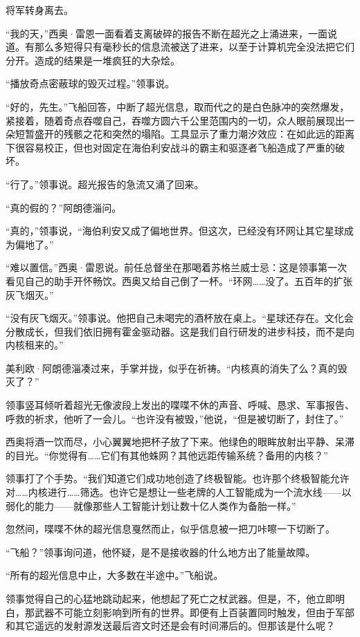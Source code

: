 \documentclass[AutoFakeBold=true]{book}
\begin{document}
将军转身离去。

\vspace*{1em}

``我的天，''西奥·雷恩一面看着支离破碎的报告不断在超光之上涌进来，一面说道。有那么多短得只有毫秒长的信息流被送了进来，以至于计算机完全没法把它们分开。造成的结果是一堆疯狂的大杂烩。

``播放奇点密蔽球的毁灭过程。''领事说。

``好的，先生。''飞船回答，中断了超光信息，取而代之的是白色脉冲的突然爆发，紧接着，随着奇点吞噬自己，吞噬方圆六千公里范围内的一切，众人眼前展现出一朵短暂盛开的残骸之花和突然的塌陷。工具显示了重力潮汐效应：在如此远的距离下很容易校正，但也对固定在海伯利安战斗的霸主和驱逐者飞船造成了严重的破坏。

``行了。''领事说。超光报告的急流又涌了回来。

``真的假的？''阿朗德淄问。

``真的，''领事说，``海伯利安又成了偏地世界。但这次，已经没有环网让其它星球成为偏地了。''

``难以置信。''西奥·雷恩说。前任总督坐在那喝着苏格兰威士忌：这是领事第一次看见自己的助手开怀畅饮。西奥又给自己倒了一杯。``环网……没了。五百年的扩张灰飞烟灭。''

``没有灰飞烟灭。''领事说。他把自己未喝完的酒杯放在桌上。``星球还存在。文化会分散成长，但我们依旧拥有霍金驱动器。这是我们自行研发的进步科技，而不是向内核租来的。''

美利欧·阿朗德淄凑过来，手掌并拢，似乎在祈祷。``内核真的消失了么？真的毁灭了？''

领事竖耳倾听着超光无像波段上发出的喋喋不休的声音、呼喊、恳求、军事报告、呼救的祈求，他听了一会儿。``也许没有被毁，''他说，``但是被切断了，封住了。''

西奥将酒一饮而尽，小心翼翼地把杯子放了下来。他绿色的眼眸放射出平静、呆滞的目光。``你觉得有……它们有其他蛛网？其他远距传输系统？备用的内核？''

领事打了个手势。``我们知道它们成功地创造了终极智能。也许那个终极智能允许对……内核进行……筛选。也许它是想让一些老牌的人工智能成为一个流水线——以弱化的能力——就像那些人工智能计划让数十亿人类作为备胎一样。''

忽然间，喋喋不休的超光信息戛然而止，似乎信息被一把刀咔嚓一下切断了。

``飞船？''领事询问道，他怀疑，是不是接收器的什么地方出了能量故障。

``所有的超光信息中止，大多数在半途中。''飞船说。

领事觉得自己的心猛地跳动起来，他想起了死亡之杖武器。但是，不，他立即明白，那武器不可能立刻影响到所有的世界。即便有上百装置同时触发，但由于军部和其它遥远的发射源发送最后咨文时还是会有时间滞后的。但那该是什么呢？
\end{document}
